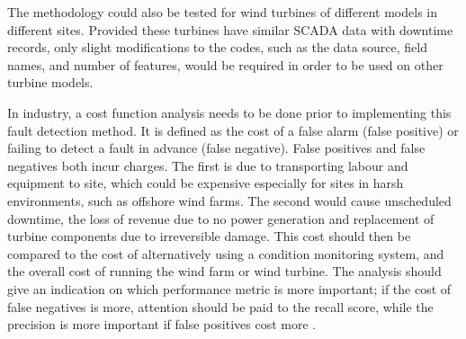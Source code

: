 The methodology could also be tested for wind turbines of different models in different sites. Provided these turbines have similar SCADA data with downtime records, only slight modifications to the codes, such as the data source, field names, and number of features, would be required in order to be used on other turbine models.

In industry, a cost function analysis needs to be done prior to implementing this fault detection method. It is defined as the cost of a false alarm (false positive) or failing to detect a fault in advance (false negative). False positives and false negatives both incur charges. The first is due to transporting labour and equipment to site, which could be expensive especially for sites in harsh environments, such as offshore wind farms. The second would cause unscheduled downtime, the loss of revenue due to no power generation and replacement of turbine components due to irreversible damage. This cost should then be compared to the cost of alternatively using a condition monitoring system, and the overall cost of running the wind farm or wind turbine. The analysis should give an indication on which performance metric is more important; if the cost of false negatives is more, attention should be paid to the recall score, while the precision is more important if false positives cost more \cite{deRu15}.
